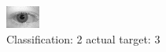 \begin{figure}[h!]
\begin{center}
\includegraphics[width=0.60\columnwidth]{figures/ID666_class_2_target_3.png}
\end{center}
\caption{ Classification: 2 actual target: 3}
\label{fig:ID666_class_2_target_3}
\end{figure}
